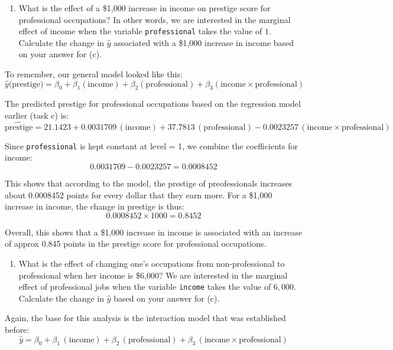 \documentclass[
]{article}
\begin{document}
\vspace{.35cm}

\begin{enumerate}
	
	\item [(f)]
What is the effect of a \$1,000 increase in income on prestige score for professional occupations? In other words, we are interested in the marginal effect of income when the variable \texttt{professional} takes the value of $1$. Calculate the change in $\hat{y}$ associated with a \$1,000 increase in income based on your answer for (c).
\end{enumerate}

To remember, our general model looked like this: 
\[ \widehat{y}(\text{prestige)} = \beta_0 + \beta_1(\text{income}) + \beta_2(\text{professional}) + \beta_3(\text{income}\times\text{professional})\]

The predicted prestige for professional occupations based on the regression model earlier (task c) is:  
\[
\widehat{\text{prestige}} = 21.1423 + 0.0031709\,(\text{income}) + 37.7813\,(\text{professional}) - 0.0023257\,(\text{income} \times \text{professional})
\]

Since \texttt{professional} is kept constant at level = 1, we combine the coefficients for income:  
\[
0.0031709 - 0.0023257 = 0.0008452
\]

This shows that according to the model, the prestige of preofessionals increases about 0.0008452 points for every dollar that they earn more. For a \$1,000 increase in income, the change in prestige is thus:  
\[
0.0008452 \times 1000 = 0.8452
\]

Overall, this shows that a \$1,000 increase in income is associated with an increase of approx
0.845 points in the prestige score for professional occupations.

\newpage 

\begin{enumerate}
	
	\item [(g)]
What is the effect of changing one's occupations from non-professional to professional when her income is \$6,000? We are interested in the marginal effect of professional jobs when the variable \texttt{income} takes the value of $6,000$. Calculate the change in $\hat{y}$ based on your answer for (c).
\end{enumerate}

Again, the base for this analysis is the interaction model that was established before:
\[\widehat{y} = \beta_0 + \beta_1\,(\text{income}) + \beta_2\,(\text{professional}) + \beta_3\,(\text{income} \times \text{professional})\]
\end{document}
